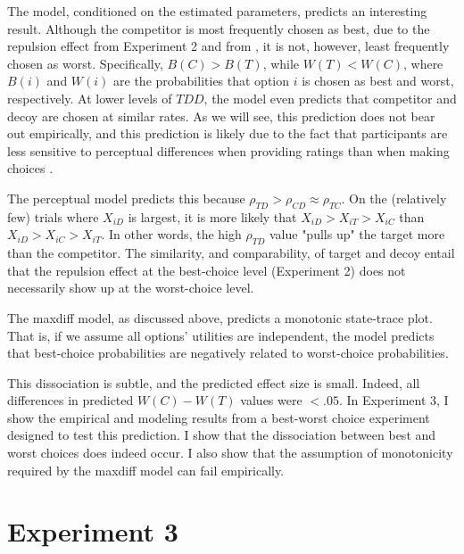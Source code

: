 The model, conditioned on the estimated parameters, predicts an interesting result. Although the competitor is most frequently chosen as best, due to the repulsion effect from Experiment 2 and from \textcite{spektorWhenGoodLooks2018b}, it is not, however, least frequently chosen as worst. Specifically, $B(C)>B(T)$, while $W(T)<W(C)$, where $B(i)$ and $W(i)$ are the probabilities that option $i$ is chosen as best and worst, respectively. At lower levels of $TDD$, the model even predicts that competitor and decoy are chosen at similar rates. As we will see, this prediction does not bear out empirically, and this prediction is likely due to the fact that participants are less sensitive to perceptual differences when providing ratings than when making choices \parencite{gronau2023choice}.

The perceptual model predicts this because $\rho_{TD}>\rho_{CD}\approx\rho_{TC}$. On the (relatively few) trials where $X_{iD}$ is largest, it is more likely that $X_{iD}>X_{iT}>X_{iC}$ than $X_{iD}>X_{iC}>X_{iT}$. In other words, the high $\rho_{TD}$ value "pulls up" the target more than the competitor. The similarity, and comparability, of target and decoy entail that the repulsion effect at the best-choice level (Experiment 2) does not necessarily show up at the worst-choice level.

The maxdiff model, as discussed above, predicts a monotonic state-trace plot. That is, if we assume all options' utilities are independent, the model predicts that best-choice probabilities are negatively related to worst-choice probabilities. 


This dissociation is subtle, and the predicted effect size is small. Indeed, all differences in predicted $W(C)-W(T)$ values were $<.05$. In Experiment 3, I show the empirical and modeling results from a best-worst choice experiment designed to test this prediction. I show that the dissociation between best and worst choices does indeed occur. I also show that the assumption of monotonicity required by the maxdiff model can fail empirically.

\section{Experiment 3}


